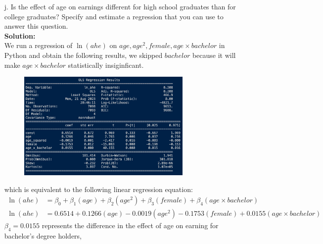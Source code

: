 \documentclass{uofa-eng-assignment}
\begin{document}
\begin{enumerate}
    \item[j.] Is the effect of age on earnings different for high school graduates than
        for college graduates? Specify and estimate a regression that you can use to
        answer this question.\\ \textbf{Solution:} \\ We run a regression of
        $\ln{(ahe)}$ on $age, age^2, female, age \times bachelor$ in Python and obtain
        the following results, we skipped $bachelor$ because it will make $age \times
            bachelor$ statistically insiginficant.
        \begin{figure}[H]
            \centering
            \includegraphics[width=0.80\textwidth]{final-exam-j-1.png}
        \end{figure}
        which is equivalent to the following linear regression equation:
        \begin{align*}
            \ln{(ahe)} & = \beta_0 +\beta_1(age) + \beta_2(age^2) + \beta_3(female) + \beta_4(age \times bachelor) \\
            \ln{(ahe)} & = 0.6514 + 0.1266(age) - 0.0019(age^2) -0.1753(female) + 0.0155(age \times bachelor)
        \end{align*}
        $\beta_4 = 0.0155$ represents the difference in the effect of age on earning for bachelor's degree holders,

\end{enumerate}
\end{document}
